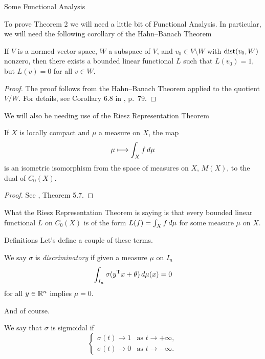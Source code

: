 \documentclass[11pt,letterpaper]{beamer}
\begin{document}
\begin{frame}{Some Functional Analysis}

  To prove Theorem 2 we will need a little bit of Functional Analysis. In
  particular, we will need the following corollary of the Hahn--Banach Theorem
  \begin{corollary}
    If $V$ is a normed vector space, $W$ a subspace of $V$, and $v_0\in
    V\setminus W$ with $\operatorname{dist}(v_0,W)$ nonzero, then there exists a
    bounded linear functional $L$ such that $L(v_0)=1$, but $L(v)=0$ for all
    $v\in W$.
  \end{corollary}
  \begin{proof}
    The proof follows from the Hahn--Banach Theorem applied to the quotient
    $V/W$. For details, see Corollary 6.8 in \cite{conway}, p.\ 79.
  \end{proof}
\end{frame}

\begin{frame}
  We will also be needing use of the Riesz Representation Theorem
  \begin{theorem}
    If $X$ is locally compact and $\mu$ a measure on $X$, the map
    \[
      \mu\longmapsto\int_X f\mathop{}\!d\mu
    \]
    is an isometric isomorphism from the space of measures on $X$, $M(X)$, to
    the dual of $C_0(X)$.
  \end{theorem}
  \begin{proof}
    See \cite{conway}, Theorem 5.7.
  \end{proof}
  What the Riesz Representation Theorem is saying is that every bounded linear
  functional $L$ on $C_0(X)$ is of the form $L(f)=\int_X f\mathop{}\!d \mu$ for some
  measure $\mu$ on $X$.
\end{frame}

\begin{frame}{Definitions}
  Let's define a couple of these terms.
  \begin{definition}
    We say $\sigma$ is \emph{discriminatory} if given a measure $\mu$ on $I_n$
    \[
      \int_{I_n}\sigma( y^{\mathrm{T}} x+\theta)\mathop{}\!d\mu( x)=0
    \]
    for all $ y\in\mathbb{R}^n$ implies $\mu=0$.
  \end{definition}
  And of course.
  \begin{definition}
    We say that $\sigma$ is sigmoidal if
    \[
      \begin{cases}
        \sigma(t)\to 1&\text{as }t\to +\infty,\\
        \sigma(t)\to 0&\text{as }t\to -\infty.
      \end{cases}
    \]
  \end{definition}
\end{frame}
\end{document}
